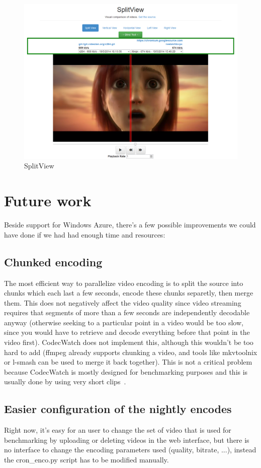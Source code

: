 \documentclass[a4paper,12pt]{article}
\begin{document}
\begin{figure}[!h] \centering
  \includegraphics[width=1\textwidth]{figures/split1.png}
  \caption{SplitView}
  \label{fig:split1}
\end{figure}

\section{Future work}
Beside support for Windows Azure, there's a few possible improvements we could
have done if we had had enough time and resources:
\subsection{Chunked encoding}
The most efficient way to parallelize video encoding is to split the source into
chunks which each last a few seconds, encode these chunks separetly, then merge
them. This does not negatively affect the video quality since video streaming
requires that segments of more than a few seconds are independently decodable
anyway (otherwise seeking to a particular point in a video would be too slow,
since you would have to retrieve and decode everything before that point in the
video first). CodecWatch does not implement this, although this wouldn't be too
hard to add (ffmpeg already supports chunking a video, and tools like mkvtoolnix
or l-smash can be used to merge it back together). This is not a critical
problem because CodecWatch is mostly designed for benchmarking purposes and this
is usually done by using very short clips~\cite{derf}.
\subsection{Easier configuration of the nightly encodes}
Right now, it's easy for an user to change the set of video that is used for
benchmarking by uploading or deleting videos in the web interface, but there is
no interface to change the encoding parameters used (quality, bitrate, ...),
instead the cron\_enco.py script has to be modified manually.
\end{document}
